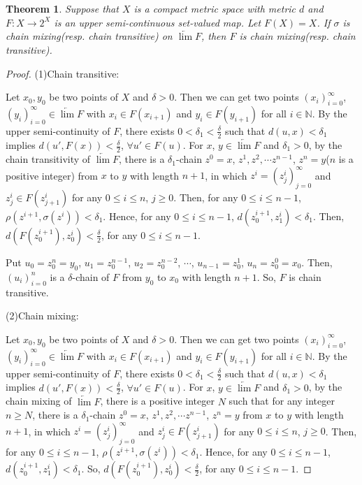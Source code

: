\documentclass[12pt]{amsart}
\newtheorem{theorem}{Theorem}[section]
\theoremstyle{definition}
\begin{document}
	\begin{theorem}\label{them5}
Suppose that $X$ is a compact metric space with metric $d$ and $F:X\rightarrow 2^X$ is an upper semi-continuous set-valued map. Let $F(X)=X$. If $\sigma$ is chain mixing(resp. chain transitive) on $\underleftarrow{\lim} F$, then $F$ is chain mixing(resp. chain transitive).
\end{theorem}
\begin{proof}    

	(1)Chain transitive:
	
	Let $x_0, y_0$ be two points of $X$ and $\delta>0$. Then we can get two points $(x_i)_{i=0}^\infty$, $(y_i)_{i=0}^\infty\in\underleftarrow{\lim} F$ with $x_{i}\in F(x_{i+1})$ and $y_{i}\in F(y_{i+1})$ for all $i\in\mathbb{N}$. By the upper semi-continuity of $F$, there exists $0<\delta_1<\frac{\delta}{2}$ such that $d(u,x)<\delta_1$ implies $d(u', F(x))<\frac{\delta}{2}$, $\forall u'\in F(u)$. For $x$, $y\in\underleftarrow{\lim} F$ and $\delta_1>0$, by the chain transitivity of $\underleftarrow{\lim} F$, there is a $\delta_1$-chain $z^0=x$, $z^1,z^2,\cdots z^{n-1}$, $z^n=y$($n$ is a positive integer) from $x$ to $y$ with length $n+1$, in which $z^i=(z_j^i)_{j=0}^\infty$ and $z^i_j\in F(z^i_{j+1})$ for any $0\leq i\leq n$, $j\geq 0$. Then, for any $0\leq i\leq n-1$, $\rho(z^{i+1}, \sigma(z^i))<\delta_1$. Hence, for any $0\leq i\leq n-1$, $d(z^{i+1}_0,z^i_1)<\delta_1$. Then, $d(F(z^{i+1}_{0}),z^{i}_0)<\frac{\delta}{2}$, for any $0\leq i\leq n-1$.
	
	Put $u_0=z^n_0=y_0$, $u_1=z^{n-1}_0$, $u_2=z^{n-2}_0$, $\cdots$, $u_{n-1}=z^{1}_0$, $u_n=z^0_0=x_0$. %
	Then, $(u_i)_{i=0}^{n}$ is a $\delta$-chain of $F$ from $y_0$ to $x_0$ with length $n+1$. So, $F$ is chain transitive.
	
	(2)Chain mixing:
	
	Let $x_0, y_0$ be two points of $X$ and $\delta>0$. Then we can get two points $(x_i)_{i=0}^\infty$, $(y_i)_{i=0}^\infty\in\underleftarrow{\lim} F$ with $x_{i}\in F(x_{i+1})$ and $y_{i}\in F(y_{i+1})$ for all $i\in\mathbb{N}$. By the upper semi-continuity of $F$, there exists $0<\delta_1<\frac{\delta}{2}$ such that $d(u,x)<\delta_1$ implies $d(u', F(x))<\frac{\delta}{2}$, $\forall u'\in F(u)$. For $x$, $y\in\underleftarrow{\lim} F$ and $\delta_1>0$, by the chain mixing of $\underleftarrow{\lim} F$, there is a positive integer $N$ such that for any integer $n\geq N$, there is a $\delta_1$-chain $z^0=x$, $z^1,z^2,\cdots z^{n-1}$, $z^n=y$ from $x$ to $y$ with length $n+1$, in which $z^i=(z_j^i)_{j=0}^\infty$ and $z^i_j\in F(z^i_{j+1})$ for any $0\leq i\leq n$, $j\geq 0$. Then, for any $0\leq i\leq n-1$, $\rho(z^{i+1}, \sigma(z^i))<\delta_1$. Hence, for any $0\leq i\leq n-1$, $d(z^{i+1}_0,z^i_1)<\delta_1$. So, $d(F(z^{i+1}_{0}),z^{i}_0)<\frac{\delta}{2}$, for any $0\leq i\leq n-1$.
	

\end{proof}
\end{document}
